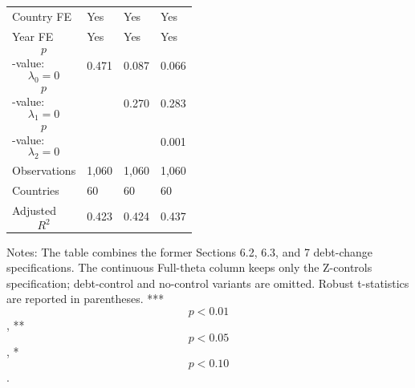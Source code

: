 \begin{table}[H]
\begin{threeparttable}
\begin{tabularx}{\textwidth}{lYYY}
Country FE & Yes & Yes & Yes \\
Year FE & Yes & Yes & Yes \\
$$p$$-value: $$\lambda_0=0$$ & 0.471 & 0.087 & 0.066 \\
$$p$$-value: $$\lambda_1=0$$ &  & 0.270 & 0.283 \\
$$p$$-value: $$\lambda_2=0$$ &  &  & 0.001 \\
Observations & 1,060 & 1,060 & 1,060 \\
Countries & 60 & 60 & 60 \\
Adjusted $$R^2$$ & 0.423 & 0.424 & 0.437 \\
\bottomrule
\end{tabularx}
\begin{tablenotes}[flushleft]\footnotesize
\item Notes: The table combines the former Sections 6.2, 6.3, and 7 debt-change specifications. The continuous Full-theta column keeps only the Z-controls specification; debt-control and no-control variants are omitted. Robust t-statistics are reported in parentheses. *** $$p<0.01$$, ** $$p<0.05$$, * $$p<0.10$$.
\end{tablenotes}
\end{threeparttable}
\end{table}
